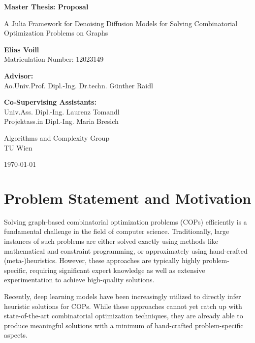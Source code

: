 \documentclass[11pt,a4paper]{article}
\begin{document}
\begin{titlepage}
        \centering
        \vspace*{1cm}
        
        \Huge
        \textbf{Master Thesis: Proposal}
        
        \vspace{0.5cm}
        \LARGE
        A Julia Framework for Denoising Diffusion Models for Solving Combinatorial Optimization Problems on Graphs
        
        \vfill
        
        \Large
        \textbf{Elias Voill} \\
        Matriculation Number: 12023149
        
        \vspace{1.5cm}
        
        \normalsize
        \textbf{Advisor:} \\
        Ao.Univ.Prof. Dipl.-Ing. Dr.techn. Günther Raidl

        \textbf{Co-Supervising Assistants:} \\
        Univ.Ass. Dipl.-Ing. Laurenz Tomandl \\
        Projektass.in Dipl.-Ing. Maria Bresich
        
        \vfill
        
        \Large
        Algorithms and Complexity Group \\
        TU Wien
        
        \vfill
        
        \large
        \today
\end{titlepage}
    
\section{Problem Statement and Motivation} \label{sec:prob-motivation}

Solving graph-based combinatorial optimization problems (COPs) efficiently is a fundamental challenge in the field of computer science. Traditionally, large instances of such problems are either solved exactly using methods like mathematical and constraint programming, or approximately using hand-crafted (meta-)heuristics. However, these approaches are typically highly problem-specific, requiring significant expert knowledge as well as extensive experimentation to achieve high-quality solutions. 

Recently, deep learning models have been increasingly utilized to directly infer heuristic solutions for COPs. While these approaches cannot yet catch up with state-of-the-art combinatorial optimization techniques, they are already able to produce meaningful solutions with a minimum of hand-crafted problem-specific aspects.
\end{document}
